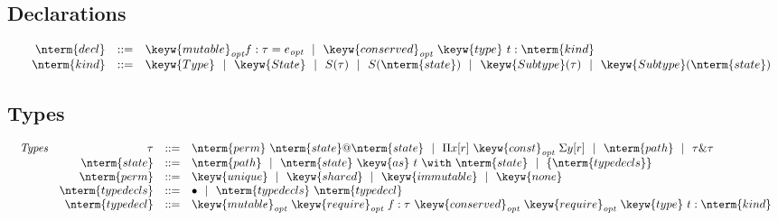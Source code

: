 \subsection{Declarations}

\[
\begin{array}{c}
\begin{array}{rrrll}
 & \nterm{decl} & ::= & \keyw{mutable}_\emph{opt} f:\tau = e_\emph{opt}
   ~~|~~\keyw{conserved}_\emph{opt}\ \keyw{type}\ t:\nterm{kind}\\
 & \nterm{kind} & ::= & \keyw{Type}~~|~~\keyw{State}~~|~~S(\tau)
                        ~~|~~S(\nterm{state})~~|~~\keyw{Subtype}(\tau)
                        ~~|~~\keyw{Subtype}(\nterm{state})\\
\end{array}
\end{array}
\]

%
%
%

\subsection{Types}
\[
\begin{array}{c}
\begin{array}{rrrll}
 \emph{Types} & \tau & ::= & \nterm{perm}\ \nterm{state} @ \nterm{state}
              ~~|~~\Pi x[r]\ \keyw{const}_\emph{opt}\ \Sigma y[r]
              ~~|~~\nterm{path}~~|~~\tau \& \tau\\
 & \nterm{state} & ::= & \nterm{path}
                 ~~|~~\nterm{state}\ \keyw{as}\ t\ \with\ \nterm{state}
                 ~~|~~\{ \nterm{typedecls} \} \\
 & \nterm{perm}  & ::= & \keyw{unique}~~|~~\keyw{shared}
                 ~~|~~\keyw{immutable}~~|~~\keyw{none}\\
 & \nterm{typedecls} & ::= & \bullet~~|~~\nterm{typedecls}\ \nterm{typedecl}\\
 & \nterm{typedecl}  & ::= & \keyw{mutable}_\emph{opt}\ 
                     \keyw{require}_\emph{opt}\ f:\tau\ 
                     \keyw{conserved}_\emph{opt}\ 
                     \keyw{require}_\emph{opt}\ 
                     \keyw{type}\ t:\nterm{kind}\\
\end{array}
\end{array}
\]


